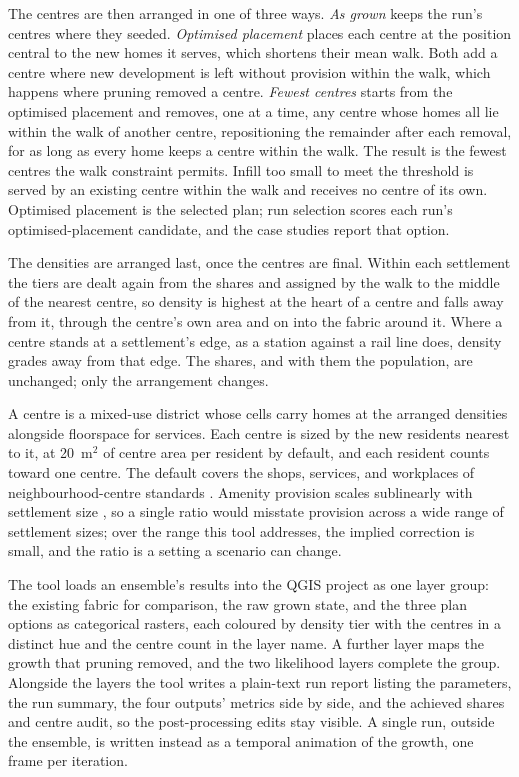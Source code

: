 \documentclass[11pt]{article}
\newcommand{\sqm}{m\(^2\)}
\begin{document}
The centres are then arranged in one of three ways.
\emph{As grown} keeps the run's centres where they
seeded. \emph{Optimised placement} places each centre at the
position central to the new homes it serves, which shortens their
mean walk. Both add a centre where new development is left without
provision within the walk, which happens where pruning removed a
centre. \emph{Fewest centres} starts from the optimised
placement and removes, one at a time, any centre whose homes all lie within the walk of another centre, repositioning the remainder after each removal, for as long as every home keeps a centre within the walk. The result is the fewest centres the walk constraint permits. Infill too small to
meet the threshold is served by an existing centre within the walk
and receives no centre of its own. Optimised placement is the
selected plan; run selection scores each run's optimised-placement
candidate, and the case studies report that option.

The densities are arranged last, once the centres are final. Within
each settlement the tiers are dealt again from the shares and
assigned by the walk to the middle of the nearest centre, so density
is highest at the heart of a centre and falls away from it, through
the centre's own area and on into the fabric around it. Where a
centre stands at a settlement's edge, as a station against a rail
line does, density grades away from that edge. The shares, and with
them the population, are unchanged; only the arrangement changes.

A centre is a mixed-use district whose cells carry homes at the
arranged densities alongside floorspace for services. Each centre
is sized by the new residents nearest to it, at 20~\sqm{} of centre area per resident by default, and each resident counts toward one centre. The
default covers the shops, services, and workplaces of
neighbourhood-centre standards \citep{barton2021}. Amenity provision
scales sublinearly with settlement size \citep{bettencourt2013}, so a
single ratio would misstate provision across a wide range of
settlement sizes; over the range this tool addresses, the implied
correction is small, and the ratio is a setting a scenario can
change.

The tool loads an ensemble's results into the QGIS project as
one layer group: the existing fabric for comparison,
the raw grown state, and the three plan options as categorical
rasters, each coloured by density tier with the centres in a
distinct hue and the centre count in the layer name. A further
layer maps the growth that pruning removed, and the two likelihood
layers complete the group. Alongside the layers the tool writes a
plain-text run report listing the parameters, the run summary,
the four outputs' metrics side by side, and the achieved shares
and centre audit, so the post-processing edits stay visible. A
single run, outside the ensemble, is written instead as a
temporal animation of the growth, one frame per iteration.
\end{document}
